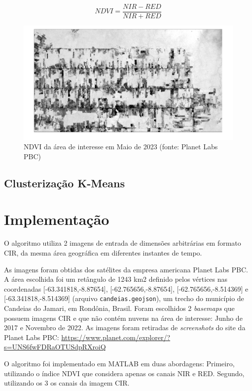 \documentclass[11pt]{article}
\begin{document}
\begin{equation} \label{eq:ndvi}
	NDVI = \frac{NIR - RED}{NIR + RED}
\end{equation}

\begin{figure}[!htb]
	\centering
	\includegraphics[width=.9\textwidth]{candeias_maio_2023_ndvi.png}
	\caption{NDVI da área de interesse em Maio de 2023 (fonte: Planet Labs PBC)}
	\label{fig:candeias_maio_2023_ndvi}
\end{figure}

\subsection{Clusterização K-Means}



\section{Implementação}

O algoritmo utiliza 2 imagens de entrada de dimensões arbitrárias em formato CIR, da mesma área geográfica em diferentes instantes de tempo.

As imagens foram obtidas dos satélites da empresa americana Planet Labs PBC. A área escolhida foi um retângulo de 1243 km2 definido pelos vértices nas coordenadas [-63.341818,-8.87654], [-62.765656,-8.87654], [-62.765656,-8.514369] e [-63.341818,-8.514369] (arquivo \verb|candeias.geojson|), um trecho do município de Candeias do Jamari, em Rondônia, Brasil. Foram escolhidos 2 \textit{basemaps} que possuem imagens CIR e que não contém nuvens na área de interesse: Junho de 2017 e Novembro de 2022. As imagens foram retiradas de \textit{screenshots} do site da Planet Labs PBC: \url{https://www.planet.com/explorer/?s=UNS6fwFDRaOTUSdpRXroiQ}

O algoritmo foi implementado em MATLAB em duas abordagens: Primeiro, utilizando o índice NDVI que considera apenas os canais NIR e RED. Segundo, utilizando os 3 os canais da imagem CIR.
\end{document}
